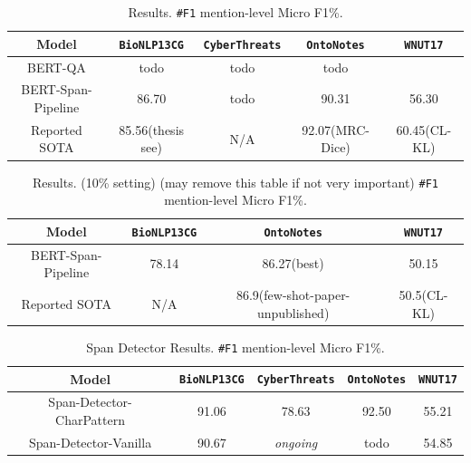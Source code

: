 \begin{table}[h!]
\centering
\begin{small}
\begin{tabular}{ccccc}\toprule
 \textbf{Model} & \texttt{BioNLP13CG} & \texttt{CyberThreats} & \texttt{OntoNotes} & \texttt{WNUT17} \\ \toprule 
BERT-QA & todo & todo & todo  \\
BERT-Span-Pipeline     & 86.70 & todo & 90.31 & 56.30  \\
Reported SOTA & 85.56(thesis see) & N/A & 92.07(MRC-Dice) & 60.45(CL-KL)  \\
\bottomrule
\end{tabular}
\caption{Results. \texttt{\#F1} mention-level Micro F1\%. }
\label{tab:main}
\end{small}
\end{table}

\begin{table}[h!]
\centering
\begin{small}
\begin{tabular}{cccc}\toprule
 \textbf{Model} & \texttt{BioNLP13CG} & \texttt{OntoNotes} & \texttt{WNUT17} \\ \toprule 
BERT-Span-Pipeline     & 78.14 & 86.27(best) & 50.15  \\
Reported SOTA & N/A & 86.9(few-shot-paper-unpublished) & 50.5(CL-KL)  \\
\bottomrule
\end{tabular}
\caption{Results. (10\% setting) (may remove this table if not very important) \texttt{\#F1} mention-level Micro F1\%.}
\label{tab:main}
\end{small}
\end{table}

\begin{table}[h!]
\centering
\begin{small}
\begin{tabular}{ccccc}\toprule
 \textbf{Model} & \texttt{BioNLP13CG} & \texttt{CyberThreats} & \texttt{OntoNotes} & \texttt{WNUT17} \\ \toprule 
Span-Detector-CharPattern & 91.06 & 78.63 & 92.50 & 55.21  \\
Span-Detector-Vanilla     & 90.67 & \textit{ongoing} & todo & 54.85  \\
\bottomrule
\end{tabular}
\caption{Span Detector Results. \texttt{\#F1} mention-level Micro F1\%.}
\label{tab:det_ablation}
\end{small}
\end{table}

